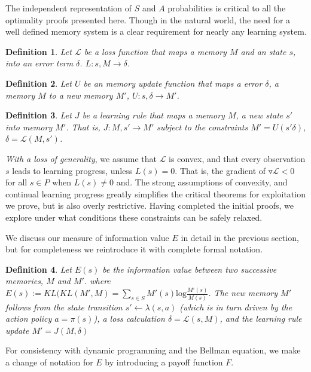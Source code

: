\documentclass[9pt,twocolumn,twoside]{pnas-new}
\newtheorem{definition}{Definition}
\begin{document}
The independent representation of $S$ and $A$ probabilities is critical to all the optimality proofs presented here. Though in the natural world, the need for a well defined memory system is a clear requirement for nearly any learning system.

\begin{definition}
    Let $\mathcal{L}$ be a loss function that maps a memory $M$ and an state $s$, into an error term $\delta$. $L : s, M \rightarrow \delta$.
\end{definition}

\begin{definition}
    Let $U$ be an memory update function that maps a error $\delta$, a memory $M$ to a new memory $M'$, $U : s, \delta \rightarrow M'$.
\end{definition}

\begin{definition}
    Let $J$ be a learning rule that maps a memory $M$, a new state $s'$ into memory $M'$. That is, $J : M, s' \rightarrow M'$ subject to the constraints  $M' = U(s' \delta)$, $\delta = \mathcal{L}(M, s')$.
\end{definition}

\textit{With a loss of generality}, we assume that $\mathcal{L}$ is convex, and that every observation $s$ leads to learning progress, unless $L(s) = 0$. That is, the gradient of $\triangledown \mathcal{L} < 0$ for all $s \in P$ when $L(s) \neq 0$ and. The strong assumptions of convexity, and continual learning progress greatly simplifies the critical theorems for exploitation we prove, but is also overly restrictive. Having completed the initial proofs, we explore under what conditions these constraints can be safely relaxed.

We discuss our measure of information value $E$ in detail in the previous section, but for completeness we reintroduce it with complete formal notation.

\begin{definition}
    Let $E(s)$ be the information value between two successive memories, $M$ and $M'$. where $E(s) := KL(KL(M', M) = \sum_{s \in S} M'(s) \text{log} \frac{M'(s)}{M(s)} $. The new memory $M'$ follows from the state transition $s' \leftarrow \lambda (s, a)$ (which is in turn driven by the action policy $a = \pi(s)$), a loss calculation $\delta = \mathcal{L}(s, M)$, and the learning rule update $M' = J(M, \delta)$
\end{definition}

For consistency with dynamic programming and the Bellman equation, we make a change of notation for $E$ by introducing a payoff function $F$.
\end{document}

